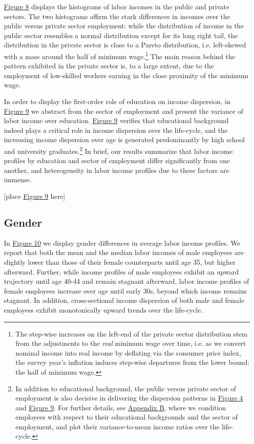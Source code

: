 \documentclass[12pt,author-year]{article}
\begin{document}
\hyperref[figure8]{Figure 8} displays the histograms of labor incomes in the public and private sectors. The two histograms affirm the stark differences in incomes over the public versus private sector employment: while the distribution of income in the public sector resembles a normal distribution except for its long right tail, the distribution in the private sector is close to a Pareto distribution, i.e. left-skewed with a mass around the half of minimum wage.\footnote{The step-wise increases on the left-end of the private sector distribution stem from the adjustments to the \emph{real} minimum wage over time, i.e. as we convert nominal income into real income by deflating via the consumer price index, the survey year's inflation induces step-wise departures from the lower bound: the half of minimum wage.} The main reason behind the pattern exhibited in the private sector is, to a large extent, due to the employment of low-skilled workers earning in the close proximity of the minimum wage. 

In order to display the first-order role of education on income dispersion, in \hyperref[figure9]{Figure 9} we abstract from the sector of employment and present the variance of labor income over education. \hyperref[figure9]{Figure 9} verifies that educational background indeed plays a critical role in income dispersion over the life-cycle, and the increasing income dispersion over age is generated predominantly by high school and university graduates.\footnote{In addition to educational background, the public versus private sector of employment is also decisive in delivering the dispersion patterns in \hyperref[figure4]{Figure 4} and \hyperref[figure9]{Figure 9}. For further details, see \hyperref[AppendixB]{Appendix B}, where we condition employees with respect to their educational backgrounds and the sector of employment, and plot their variance-to-mean income ratios over the life-cycle.} In brief, our results summarize that labor income profiles by education and sector of employment differ significantly from one another, and heterogeneity in labor income profiles due to these factors are immense.  
\begin{center}
	[place \hyperref[figure9]{Figure 9} here]
\end{center}

\subsection{Gender}
In \hyperref[figure10]{Figure 10} we display gender differences in average labor income profiles. We report that both the mean and the median labor incomes of male employees are slightly lower than those of their female counterparts until age 35, but higher afterward. Further, while income profiles of male employees exhibit an upward trajectory until age 40-44 and remain stagnant afterward, labor income profiles of female employees increase over age until early 30s, beyond which income remains stagnant. In addition, cross-sectional income dispersion of both male and female employees exhibit monotonically upward trends over the life-cycle. 
\end{document}
